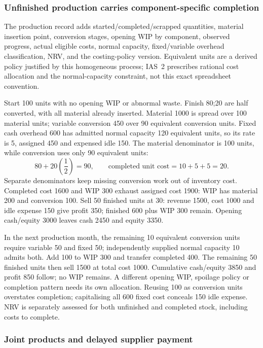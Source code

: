 \hypertarget{unfinished-production-carries-component-specific-completion}{%
\subsubsection{Unfinished production carries component-specific completion}\label{unfinished-production-carries-component-specific-completion}}

The production record adds started/completed/scrapped quantities, material insertion point, conversion stages, opening WIP by component, observed progress, actual eligible costs, normal capacity, fixed/variable overhead classification, NRV, and the costing-policy version. Equivalent units are a derived policy justified by this homogeneous process; IAS~2 \citep[IAS~2.12--18]{eu20231803} prescribes rational cost allocation and the normal-capacity constraint, not this exact spreadsheet convention.

Start 100 units with no opening WIP or abnormal waste. Finish 80;20 are half converted, with all material already inserted. Material 1000 is spread over 100 material units; variable conversion 450 over 90 equivalent conversion units. Fixed cash overhead 600 has admitted normal capacity 120 equivalent units, so its rate is 5, assigned 450 and expensed idle 150. The material denominator is 100 units, while conversion uses only 90 equivalent units:
\[80+20\left(\frac12\right)=90,\qquad\text{completed unit cost}=10+5+5=20.\]
Separate denominators keep missing conversion work out of inventory cost. Completed cost 1600 and WIP 300 exhaust assigned cost 1900: WIP has material 200 and conversion 100. Sell 50 finished units at 30: revenue 1500, cost 1000 and idle expense 150 give profit 350; finished 600 plus WIP 300 remain. Opening cash/equity 3000 leaves cash 2450 and equity 3350.

In the next production month, the remaining 10 equivalent conversion units require variable 50 and fixed 50; independently supplied normal capacity 10 admits both. Add 100 to WIP 300 and transfer completed 400. The remaining 50 finished units then sell 1500 at total cost 1000. Cumulative cash/equity 3850 and profit 850 follow; no WIP remains. A different opening WIP, spoilage policy or completion pattern needs its own allocation. Reusing 100 as conversion units overstates completion; capitalising all 600 fixed cost conceals 150 idle expense. NRV is separately assessed for both unfinished and completed stock, including costs to complete.

\hypertarget{joint-products-and-delayed-supplier-payment}{%
\subsubsection{Joint products and delayed supplier payment}\label{joint-products-and-delayed-supplier-payment}}

